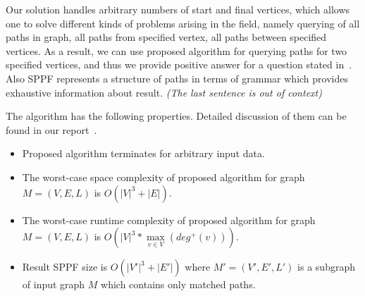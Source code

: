 %

Our solution handles arbitrary numbers of start and final vertices, which allows one to solve different kinds of problems arising in the field, namely querying of all paths in graph, all paths from specified vertex, all paths between specified vertices. As a result, we can use proposed algorithm for querying paths for two specified vertices, and thus we provide positive answer for a question stated in~\cite{Hellings16}. 
Also SPPF represents a structure of paths in terms of grammar which provides exhaustive information about result. \emph{(The last sentence is out of context)}

The algorithm has the following properties. Detailed discussion of them can be found in our report~\cite{GrigorevR16}.
\begin{itemize} 
\item Proposed algorithm terminates for arbitrary input data.
\item The worst-case space complexity of proposed algorithm for graph $M=(V,E,L)$ is $O(|V|^3 + |E|)$.
\item The worst-case runtime complexity of proposed algorithm for graph $M=(V,E,L)$ is $O\left(|V|^3*\max\limits_{v \in V}\left(deg^+\left(v\right)\right)\right).$
\item Result SPPF size is $O(|V'|^3 + |E'|)$ where $M'=(V',E',L')$ is a subgraph of input graph $M$ which contains only matched paths.
\end{itemize}
